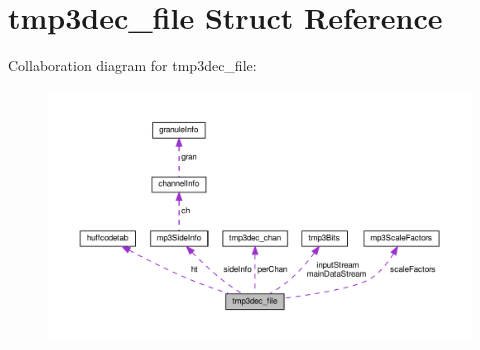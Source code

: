 \hypertarget{structtmp3dec__file}{}\section{tmp3dec\+\_\+file Struct Reference}
\label{structtmp3dec__file}


Collaboration diagram for tmp3dec\+\_\+file\+:
\nopagebreak
\begin{figure}[H]
\begin{center}
\leavevmode
\includegraphics[width=350pt]{structtmp3dec__file__coll__graph}
\end{center}
\end{figure}
